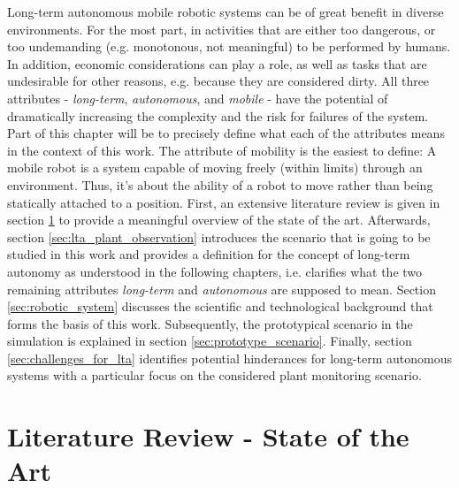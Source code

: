 \documentclass[english, master, utf8]{base/thesis_KBS}
\begin{document}
Long-term autonomous mobile robotic systems can be of great benefit in diverse environments. For the most part, in activities that are either too dangerous,
or too undemanding (e.g. monotonous, not meaningful) to be performed by humans. In addition, economic considerations can play a role, as well as tasks 
that are undesirable for other reasons, e.g. because they are considered dirty.
All three attributes - \textit{long-term}, \textit{autonomous}, and \textit{mobile} - have the potential of dramatically increasing the complexity and
the risk for failures of the system. Part of this chapter will be to precisely define what each of the attributes means in the context of this work.
The attribute of mobility is the easiest to define: A mobile robot is a system capable of moving freely (within limits) through an environment. \cite{Hertzberg:2012}
Thus, it's about the ability of a robot to move rather than being statically attached to a position.\newline
First, an extensive literature review is given in section \ref{sec:literature_review} to provide a meaningful overview of the state of the art.
Afterwards, section \ref{sec:lta_plant_observation} introduces the scenario that is going to be studied in this work and provides a definition for the concept of long-term
autonomy as understood in the following chapters, i.e. clarifies what the two remaining attributes \textit{long-term} and \textit{autonomous} are supposed to mean.
Section \ref{sec:robotic_system} discusses the scientific and technological background that forms the basis of this work.
Subsequently, the prototypical scenario in the simulation is explained in section \ref{sec:prototype_scenario}.
Finally, section \ref{sec:challenges_for_lta} identifies potential hinderances for long-term autonomous systems with a particular focus on the considered plant monitoring scenario.

\section{Literature Review - State of the Art}
\label{sec:literature_review}
\end{document}
